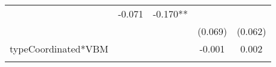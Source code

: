 \documentclass[]{article}
\begin{document}
\begin{longtable}[]{@{}lcccc@{}}
\begin{minipage}[t]{0.13\columnwidth}
\strut
\end{minipage} & \begin{minipage}[t]{0.14\columnwidth}\centering\strut
-0.071\strut
\end{minipage} & \begin{minipage}[t]{0.14\columnwidth}\centering\strut
-0.170**\strut
\end{minipage}\tabularnewline
\begin{minipage}[t]{0.26\columnwidth}\raggedright\strut
\strut
\end{minipage} & \begin{minipage}[t]{0.12\columnwidth}\centering\strut
\strut
\end{minipage} & \begin{minipage}[t]{0.13\columnwidth}\centering\strut
\strut
\end{minipage} & \begin{minipage}[t]{0.14\columnwidth}\centering\strut
(0.069)\strut
\end{minipage} & \begin{minipage}[t]{0.14\columnwidth}\centering\strut
(0.062)\strut
\end{minipage}\tabularnewline
\begin{minipage}[t]{0.26\columnwidth}\raggedright\strut
typeCoordinated*VBM\strut
\end{minipage} & \begin{minipage}[t]{0.12\columnwidth}\centering\strut
\strut
\end{minipage} & \begin{minipage}[t]{0.13\columnwidth}\centering\strut
\strut
\end{minipage} & \begin{minipage}[t]{0.14\columnwidth}\centering\strut
-0.001\strut
\end{minipage} & \begin{minipage}[t]{0.14\columnwidth}\centering\strut
0.002\strut
\end{minipage}\tabularnewline
\begin{minipage}[t]{0.26\columnwidth}\raggedright\strut
\strut
\end{minipage} & \begin{minipage}[t]{0.12\columnwidth}\centering\strut
\strut
\end{minipage} & \begin{minipage}[t]{0.13\columnwidth}\centering\strut
\strut
\end{minipage} & \begin{minipage}[t]{0.14\columnwidth}\centering\strut

\end{minipage}
\end{longtable}
\end{document}

